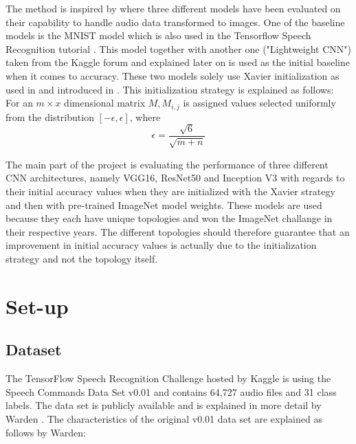 \documentclass{article}
\theoremstyle{definition}
\theoremstyle{remark}
\begin{document}
The method is inspired by \cite{gouda2018speech} where three different models have been evaluated on their capability to handle audio data transformed to images. One of the baseline models is the MNIST model which is also used in the Tensorflow Speech Recognition tutorial \cite{tutorial}. This model together with another one ("Lightweight CNN") taken from the Kaggle forum and explained later on is used as the initial baseline when it comes to accuracy. These two models solely use Xavier initialization as used in \cite{gouda2018speech} and introduced in \cite{glorot2010understanding}. This initialization strategy is explained as follows:\\


For an $m \times x$ dimensional matrix $M, M_{i,j}$ is assigned values selected uniformly from the distribution $[-\epsilon, \epsilon]$, where
\begin{equation} \label{eq:xavier}
\epsilon = \frac{\sqrt{6}}{\sqrt{m + n}}
\end{equation}

The main part of the project is evaluating the performance of three different CNN architectures, namely VGG16, ResNet50 and Inception V3 with regards to their initial accuracy values when they are initialized with the Xavier strategy and then with pre-trained ImageNet model weights. These models are used because they each have unique topologies and won the ImageNet challange in their respective years. The different topologies should therefore guarantee that an improvement in initial accuracy values is actually due to the initialization strategy and not the topology itself.



\section{Set-up} \label{setup}



\subsection{Dataset} 

The TensorFlow Speech Recognition Challenge hosted by Kaggle \cite{kaggle_challenge} is using the Speech Commands Data Set v0.01 and contains 64,727 audio files and 31 class labels. The data set is publicly available \cite{scd_v1} and is explained in more detail by Warden \cite{warden2018speech}. The characteristics of the original v0.01 data set are explained as follows by Warden:
\end{document}
